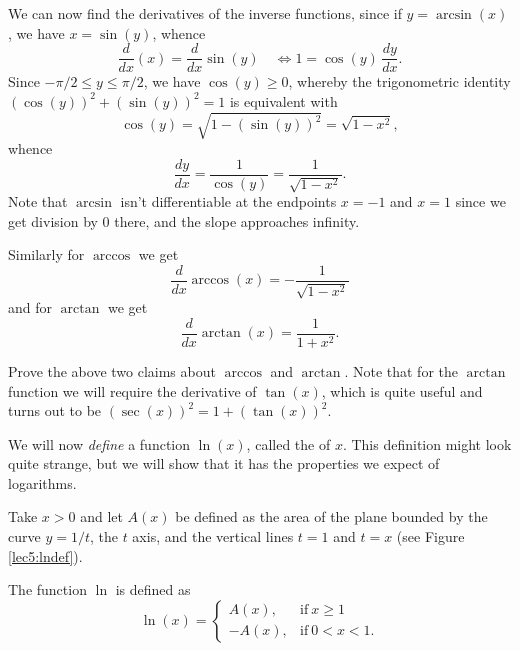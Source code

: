 \noindent
We can now find the derivatives of the inverse functions, since if $y = \arcsin(x)$, we have $x = \sin(y)$, whence
\[
	\frac{d}{d x} (x) = \frac{d}{d x} \sin(y) \quad \Longleftrightarrow 1 = \cos(y) \, \frac{d y}{d x}.
\]
Since $-\pi / 2 \leq y \leq \pi / 2$, we have $\cos(y) \geq 0$, whereby the trigonometric identity $(\cos(y))^2 + (\sin(y))^2 = 1$ is equivalent with
\[
	\cos(y) = \sqrt{1 - (\sin(y))^2} = \sqrt{1 - x^2},
\]
whence
\[
	\frac{d y}{d x} = \frac{1}{\cos(y)} = \frac{1}{\sqrt{1 - x^2}}.
\]
Note that $\arcsin$ isn't differentiable at the endpoints $x = -1$ and $x = 1$ since we get division by $0$ there, and the slope approaches infinity.

Similarly for $\arccos$ we get
\[
	\frac{d}{d x} \arccos(x) = - \frac{1}{\sqrt{1 - x^2}}
\]
and for $\arctan$ we get
\[
	\frac{d}{d x} \arctan(x) = \frac{1}{1 + x^2}.
\]

\begin{exercise}
	Prove the above two claims about $\arccos$ and $\arctan$.
	Note that for the $\arctan$ function we will require the derivative of $\tan(x)$, which is quite useful and turns out to be $(\sec(x))^2 = 1 + (\tan(x))^2$.
\end{exercise}



We will now \emph{define} a function $\ln(x)$, called the  of $x$.
This definition might look quite strange, but we will show that it has the properties we expect of logarithms.

\begin{definition}
	Take $x > 0$ and let $A(x)$ be defined as the area of the plane bounded by the curve $y = 1/t$, the $t$ axis, and the vertical lines $t = 1$ and $t = x$ (see Figure \ref{lec5:lndef}).

	The function $\ln$ is defined as
	\[
		\ln(x) = \begin{cases}
		A(x), & \text{if}~ x \geq 1 \\
		- A(x), & \text{if}~ 0 < x < 1.
		\end{cases}
	\]
\end{definition}

